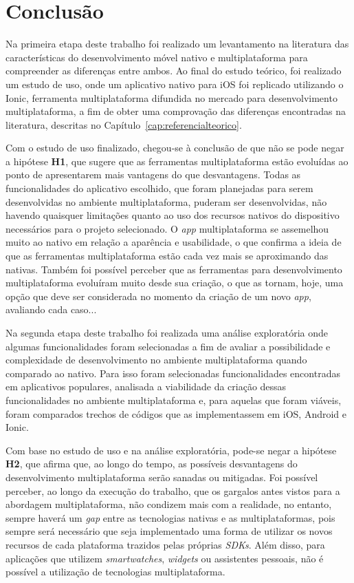 \chapter{Conclusão} \label{cap:consideracoespreliminares}
Na primeira etapa deste trabalho foi realizado um levantamento na literatura das características do desenvolvimento móvel nativo e multiplataforma para compreender as diferenças entre ambos. Ao final do estudo teórico, foi 
realizado um estudo de uso, onde um aplicativo nativo para iOS foi replicado utilizando o Ionic, ferramenta multiplataforma difundida 
no mercado para desenvolvimento multiplataforma, a fim de obter uma comprovação das diferenças encontradas na literatura, descritas no Capítulo~\ref{cap:referencialteorico}.

Com o estudo de uso finalizado, chegou-se à conclusão de que não se pode negar a hipótese \textbf{H1}, que sugere que as ferramentas multiplataforma estão evoluídas ao ponto de apresentarem mais vantagens do que desvantagens.
Todas as funcionalidades do aplicativo escolhido, que foram planejadas para serem desenvolvidas no ambiente multiplataforma, puderam ser desenvolvidas, não havendo quaisquer limitações quanto ao uso dos 
recursos nativos do dispositivo necessários para o projeto selecionado. O \textit{app} multiplataforma se assemelhou muito ao nativo em relação a aparência e usabilidade, o que confirma a ideia de que as ferramentas 
multiplataforma estão cada vez mais se aproximando das nativas. Também foi possível perceber que as ferramentas para desenvolvimento multiplataforma evoluíram muito desde sua criação, o que as tornam, hoje, uma 
opção que deve ser considerada no momento da criação de um novo \textit{app}, avaliando cada caso...

Na segunda etapa deste trabalho foi realizada uma análise exploratória onde algumas funcionalidades foram selecionadas a fim de avaliar a possibilidade e complexidade de desenvolvimento no ambiente 
multiplataforma quando comparado ao nativo. Para isso foram selecionadas funcionalidades encontradas em aplicativos populares, analisada a viabilidade da criação dessas funcionalidades no ambiente multiplataforma e, 
para aquelas que foram viáveis, foram comparados trechos de códigos que as implementassem em iOS, Android e Ionic. 

Com base no estudo de uso e na análise exploratória, pode-se negar a hipótese \textbf{H2}, que afirma que, ao longo do tempo, as possíveis desvantagens do desenvolvimento multiplataforma serão sanadas ou mitigadas. 
Foi possível perceber, ao longo da execução do trabalho, que os gargalos antes vistos para a abordagem multiplataforma, não condizem mais com a realidade, no entanto, sempre haverá um \textit{gap} entre as tecnologias 
nativas e as multiplataformas, pois sempre será necessário que seja implementado uma forma de utilizar os novos recursos de cada plataforma trazidos pelas próprias \textit{SDKs}. Além disso, para aplicações que utilizem 
\textit{smartwatches}, \textit{widgets} ou assistentes pessoais, não é possível a utilização de tecnologias multiplataforma.

